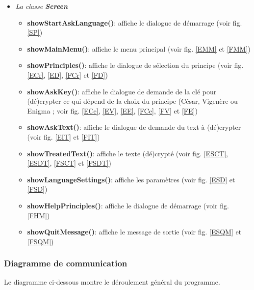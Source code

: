 \documentclass[a4paper,12pt,abstracton,titlepage]{scrartcl}
\begin{document}
\begin{itemize}
\item \textit{La classe \textbf{Screen}}\vspace{0.3cm}
\begin{itemize}
\item \textbf{showStartAskLanguage()}:
affiche le dialogue de démarrage (voir fig. \ref{SP})\\
\item \textbf{showMainMenu()}:
affiche le menu principal (voir fig. \ref{EMM} et \ref{FMM})\\
\item \textbf{showPrinciples()}:
affiche le dialogue de sélection du principe (voir fig. \ref{ECr}, \ref{ED}, \ref{FCr} et \ref{FD})\\
\item \textbf{showAskKey()}:
affiche le dialogue de demande de la clé pour (dé)crypter ce qui dépend de la choix du principe (César, Vigenère ou Enigma ; voir fig. \ref{ECe}, \ref{EV}, \ref{EE}, \ref{FCe}, \ref{FV} et \ref{FE})\\
\item \textbf{showAskText()}:
affiche le dialogue de demande du text à (dé)crypter\\(voir fig. \ref{EIT} et \ref{FIT})\\
\item \textbf{showTreatedText()}:
affiche le texte (dé)crypté (voir fig. \ref{ESCT}, \ref{ESDT}, \ref{FSCT} et \ref{FSDT})\\
\item \textbf{showLanguageSettings()}:
affiche les paramètres (voir fig. \ref{ESD} et \ref{FSD})\\
\item \textbf{showHelpPrinciples()}:
affiche le dialogue de démarrage (voir fig. \ref{FHM})\\
\item \textbf{showQuitMessage()}:
affiche le message de sortie (voir fig. \ref{ESQM} et \ref{FSQM})\\
\end{itemize}
\end{itemize}


\subsubsection{Diagramme de communication}
Le diagramme ci-dessous montre le déroulement général du programme.
\end{document}
